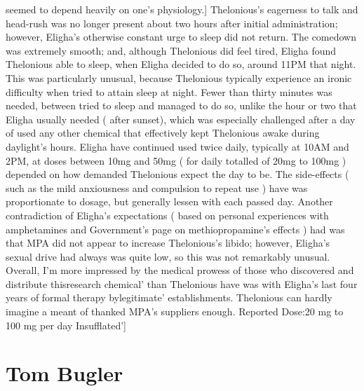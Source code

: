 \documentclass[12pt]{book}
\begin{document}
seemed to depend heavily on one's physiology.] Thelonious's eagerness to talk and head-rush was no longer present about two hours after initial administration; however, Eligha's otherwise constant urge to sleep did not return. The comedown was extremely smooth; and, although Thelonious did feel tired, Eligha found Thelonious able to sleep, when Eligha decided to do so, around 11PM that night. This was particularly unusual, because Thelonious typically experience an ironic difficulty when tried to attain sleep at night. Fewer than thirty minutes was needed, between tried to sleep and managed to do so, unlike the hour or two that Eligha usually needed ( after sunset), which was especially challenged after a day of used any other chemical that effectively kept Thelonious awake during daylight's hours. Eligha have continued used twice daily, typically at 10AM and 2PM, at doses between 10mg and 50mg ( for daily totalled of 20mg to 100mg ) depended on how demanded Thelonious expect the day to be. The side-effects ( such as the mild anxiousness and compulsion to repeat use ) have was proportionate to dosage, but generally lessen with each passed day. Another contradiction of Eligha's expectations ( based on personal experiences with amphetamines and Government's page on methiopropamine's effects ) had was that MPA did not appear to increase Thelonious's libido; however, Eligha's sexual drive had always was quite low, so this was not remarkably unusual. Overall, I'm more impressed by the medical prowess of those who discovered and distribute thisresearch chemical' than Thelonious have was with Eligha's last four years of formal therapy bylegitimate' establishments. Thelonious can hardly imagine a meant of thanked MPA's suppliers enough. Reported Dose:20 mg to 100 mg per day Insufflated']



\chapter{Tom Bugler}
\end{document}
